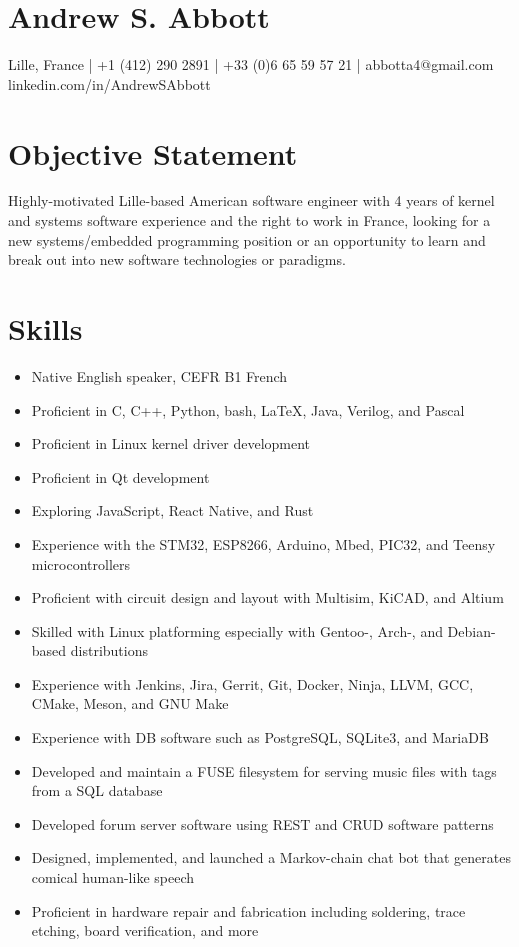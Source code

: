 \documentclass[letterpaper,10pt]{article}
\begin{document}
\pagestyle{empty}

\large\section{Andrew S. Abbott}
\normalsize
\begin{center}
  Lille, France |
  +1 (412) 290 2891 |
  +33 (0)6 65 59 57 21 |
  abbotta4@gmail.com\\
  linkedin.com/in/AndrewSAbbott\par
\end{center}

\section{Objective Statement}
Highly-motivated Lille-based American software engineer with 4 years of kernel and systems software experience and the right to work in France, looking for a new systems/embedded programming position or an opportunity to learn and break out into new software technologies or paradigms.

\section{Skills}
\begin{itemize}
\item Native English speaker, CEFR B1 French
\item Proficient in C, C++, Python, bash, \LaTeX, Java, Verilog, and Pascal
\item Proficient in Linux kernel driver development
\item Proficient in Qt development
\item Exploring JavaScript, React Native, and Rust
\item Experience with the STM32, ESP8266, Arduino, Mbed, PIC32, and Teensy microcontrollers
\item Proficient with circuit design and layout with Multisim, KiCAD, and Altium
\item Skilled with Linux platforming especially with Gentoo-, Arch-, and Debian-based distributions
\item Experience with Jenkins, Jira, Gerrit, Git, Docker, Ninja, LLVM, GCC, CMake, Meson, and GNU Make
\item Experience with DB software such as PostgreSQL, SQLite3, and MariaDB
\item Developed and maintain a FUSE filesystem for serving music files with tags from a SQL database
\item Developed forum server software using REST and CRUD software patterns
\item Designed, implemented, and launched a Markov-chain chat bot that generates comical human-like speech
\item Proficient in hardware repair and fabrication including soldering, trace etching, board verification, and more
\end{itemize}
\end{document}
